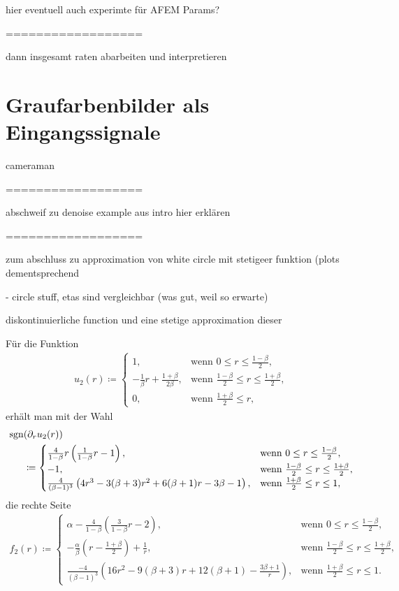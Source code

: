 hier eventuell auch experimte für AFEM Params?

==================

dann insgesamt raten abarbeiten und interpretieren


\section{Graufarbenbilder als Eingangssignale}
cameraman

==================

abschweif zu denoise example aus intro hier erklären

==================

zum abschluss zu approximation von white circle mit stetigeer funktion (plots
dementsprechend

  - circle stuff, etas sind vergleichbar (was gut, weil so erwarte)

diskontinuierliche function und eine stetige approximation dieser

Für die Funktion
\begin{align*}
  u_2(r)\coloneqq 
  \begin{cases}
    1, & \text{wenn } 0\leq r\leq\frac{1-\beta}{2},\\
    -\frac{1}{\beta}r + \frac{1+\beta}{2\beta}, & 
    \text{wenn } \frac{1-\beta}{2}\leq r\leq \frac{1+\beta}{2},\\
    0, & \text{wenn } \frac{1+\beta}{2}\leq r,
  \end{cases}
\end{align*}
erhält man mit der Wahl
\begin{align*}
  \operatorname{sgn}&(\partial_r u_2(r)) \\
  &\coloneqq 
  \begin{cases}
    \frac{4}{1-\beta}r\left(\frac{1}{1-\beta}r -1\right), &
    \text{wenn } 0\leq r\leq\frac{1-\beta}{2},\\
    -1, & \text{wenn } \frac{1-\beta}{2}\leq r\leq \frac{1+\beta}{2},\\
    \frac{4}{(\beta-1)^3}
    \left( 4r^3-3(\beta+3)r^2 +6(\beta+1)r-3\beta-1\right), & 
    \text{wenn } \frac{1+\beta}{2}\leq r\leq 1,
  \end{cases}
\end{align*}
die rechte Seite
\begin{align*}
  f_2(r)\coloneqq 
  \begin{cases}
    \alpha - \frac{4}{1-\beta}\left(\frac{3}{1-\beta}r - 2\right), &
    \text{wenn } 0\leq r\leq\frac{1-\beta}{2},\\
    -\frac{\alpha}{\beta}\left( r-\frac{1+\beta}{2} \right) +\frac{1}{r}, & 
    \text{wenn } \frac{1-\beta}{2}\leq r\leq \frac{1+\beta}{2},\\
    \frac{-4}{(\beta-1)^3}
    \left( 16r^2 -9(\beta+3)r + 12(\beta+1) - \frac{3\beta+1}{r}\right), & 
    \text{wenn } \frac{1+\beta}{2}\leq r\leq 1.
  \end{cases}
\end{align*}


